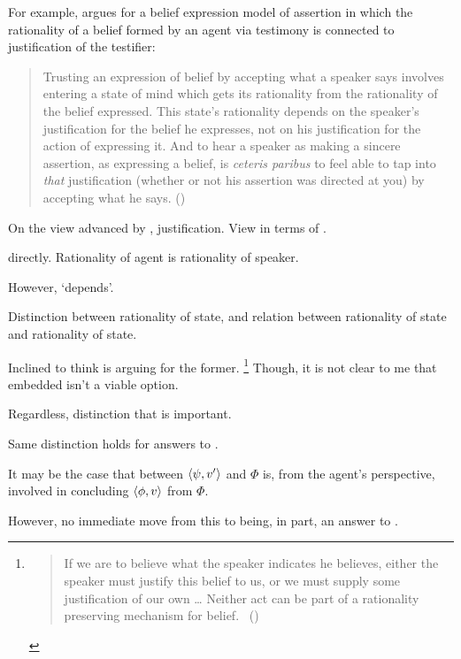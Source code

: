 \begin{note}
  For example, \citeauthor{Owens:2006tw} argues for a belief expression model of assertion in which the rationality of a belief formed by an agent via testimony is connected to justification of the testifier:

  \begin{quote}
    Trusting an expression of belief by accepting what a speaker says involves entering a state of mind which gets its rationality from the rationality of the belief expressed.
    This state's rationality depends on the speaker's justification for the belief he expresses, not on his justification for the action of expressing it.
    And to hear a speaker as making a sincere assertion, as expressing a belief, is \emph{ceteris paribus} to feel able to tap into \emph{that} justification (whether or not his assertion was directed at you) by accepting what he says.%
    \mbox{}\hfill\mbox{(\citeyear[123]{Owens:2006tw})}
  \end{quote}

  On the view advanced by \citeauthor{Owens:2006tw}, justification.
  View in terms of \support{}.

  \support{} directly.
  Rationality of agent is rationality of speaker.

  However, `depends'.

  Distinction between rationality of state, and relation between rationality of state and rationality of state.

  Inclined to think \citeauthor{Owens:2006tw} is arguing for the former.%
  \footnote{
    \begin{quote}
      If we are to believe what the speaker indicates he believes, either the speaker must justify this belief to us, or we must supply some justification of our own
      \dots
      Neither act can be part of a rationality preserving mechanism for belief.%
      \mbox{ }\hfill\mbox{(\citeyear[123--124]{Owens:2006tw})}
    \end{quote}
  }
  Though, it is not clear to me that embedded isn't a viable option.

  Regardless, distinction that is important.
\end{note}

\begin{note}
  Same distinction holds for answers to \qWhyV{}.

  It may be the case that \support{} between \(\langle \psi, v' \rangle\) and \(\Phi\) is, from the agent's perspective, involved in concluding \(\langle \phi, v \rangle\) from \(\Phi\).

  However, no immediate move from this to \support{} being, in part, an answer to \qWhyV{}.
\end{note}

